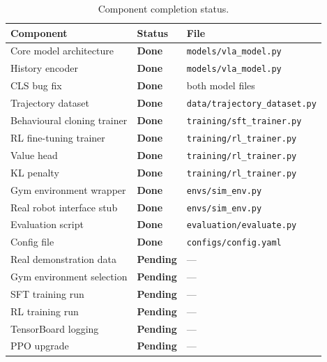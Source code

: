 \documentclass[12pt, a4paper]{article}
\begin{document}
\begin{table}[h]
\centering
\caption{Component completion status.}
\begin{tabular}{L{6cm} C{2.5cm} L{4cm}}
\toprule
\textbf{Component} & \textbf{Status} & \textbf{File} \\
\midrule
Core model architecture    & \textcolor{SuccessGreen}{\textbf{Done}} & \texttt{models/vla\_model.py} \\
History encoder            & \textcolor{SuccessGreen}{\textbf{Done}} & \texttt{models/vla\_model.py} \\
CLS bug fix                & \textcolor{SuccessGreen}{\textbf{Done}} & both model files \\
Trajectory dataset         & \textcolor{SuccessGreen}{\textbf{Done}} & \texttt{data/trajectory\_dataset.py} \\
Behavioural cloning trainer& \textcolor{SuccessGreen}{\textbf{Done}} & \texttt{training/sft\_trainer.py} \\
RL fine-tuning trainer     & \textcolor{SuccessGreen}{\textbf{Done}} & \texttt{training/rl\_trainer.py} \\
Value head                 & \textcolor{SuccessGreen}{\textbf{Done}} & \texttt{training/rl\_trainer.py} \\
KL penalty                 & \textcolor{SuccessGreen}{\textbf{Done}} & \texttt{training/rl\_trainer.py} \\
Gym environment wrapper    & \textcolor{SuccessGreen}{\textbf{Done}} & \texttt{envs/sim\_env.py} \\
Real robot interface stub  & \textcolor{SuccessGreen}{\textbf{Done}} & \texttt{envs/sim\_env.py} \\
Evaluation script          & \textcolor{SuccessGreen}{\textbf{Done}} & \texttt{evaluation/evaluate.py} \\
Config file                & \textcolor{SuccessGreen}{\textbf{Done}} & \texttt{configs/config.yaml} \\
\midrule
Real demonstration data    & \textcolor{AlertRed}{\textbf{Pending}} & — \\
Gym environment selection  & \textcolor{AlertRed}{\textbf{Pending}} & — \\
SFT training run           & \textcolor{AlertRed}{\textbf{Pending}} & — \\
RL training run            & \textcolor{AlertRed}{\textbf{Pending}} & — \\
TensorBoard logging        & \textcolor{AlertRed}{\textbf{Pending}} & — \\
PPO upgrade                & \textcolor{AlertRed}{\textbf{Pending}} & — \\
\bottomrule
\end{tabular}
\end{table}
\end{document}
